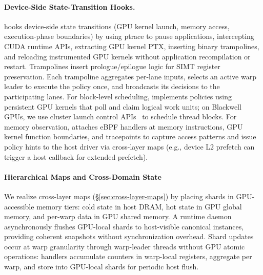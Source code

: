 \paragraph{Device-Side State-Transition Hooks.}
\sys hooks device-side state transitions (GPU kernel launch, memory access, execution-phase boundaries) by using ptrace to pause applications, intercepting CUDA runtime APIs, extracting GPU kernel PTX, inserting binary trampolines, and reloading instrumented GPU kernels without application recompilation or restart.
Trampolines insert prologue/epilogue logic for SIMT register preservation.
Each trampoline aggregates per-lane inputs, selects an active warp leader to execute the policy once, and broadcasts its decisions to the participating lanes.
For block-level scheduling, \sys implements policies using persistent GPU kernels that poll and claim logical work units; on Blackwell GPUs, we use cluster launch control APIs~\cite{cuda-clc} to schedule thread blocks.
For memory observation, \sys attaches eBPF handlers at memory instructions, GPU kernel function boundaries, and tracepoints to capture access patterns and issue policy hints to the host driver via cross-layer maps (e.g., device L2 prefetch can trigger a host callback for extended prefetch).

\paragraph{Hierarchical Maps and Cross-Domain State}

We realize cross-layer maps (\S\ref{sec:cross-layer-maps}) by placing shards in GPU-accessible memory tiers: cold state in host DRAM, hot state in GPU global memory, and per-warp data in GPU shared memory.
A runtime daemon asynchronously flushes GPU-local shards to host-visible canonical instances, providing coherent snapshots without synchronization overhead.
Shard updates occur at warp granularity through warp-leader threads without GPU atomic operations: handlers accumulate counters in warp-local registers, aggregate per warp, and store into GPU-local shards for periodic host flush.
